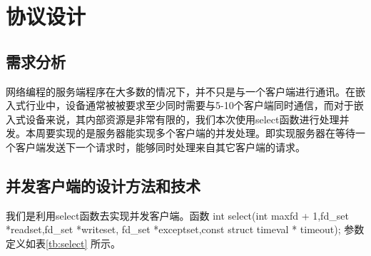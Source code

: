 \chapter{协议设计}

\section{需求分析}

网络编程的服务端程序在大多数的情况下，并不只是与一个客户端进行通讯。在嵌入式行业中，设备通常被被要求至少同时需要与5-10个客户端同时通信，而对于嵌入式设备来说，其内部资源是非常有限的，我们本次使用select函数进行处理并发。本周要实现的是服务器能实现多个客户端的并发处理。即实现服务器在等待一个客户端发送下一个请求时，能够同时处理来自其它客户端的请求。

\section{并发客户端的设计方法和技术}

我们是利用select函数去实现并发客户端。函数  int select(int maxfd + 1,fd\_set *readset,fd\_set *writeset, fd\_set *exceptset,const struct timeval * timeout); 参数定义如表\ref{tb:select} 所示。


